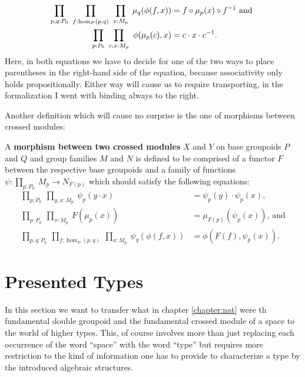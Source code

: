 \begin{defn}
\begin{itemize}
\begin{align*}
\prod_{p,q:P_0} ~ \prod_{f:\hom_P(p,q)} ~ \prod_{x:M_p} ~
	\mu_q(\phi(f,x)) &= f \circ \mu_p(x) \circ f^{-1} \text{ and } \\
\prod_{p:P_0} ~ \prod_{c,x:M_p} ~ \phi(\mu_p(c),x) &= c \cdot x \cdot c^{-1} \text{.}
\end{align*}
Here, in both equations we have to decide for one of the two ways to place parentheses
in the right-hand side of the equation, because associativity only holds propositionally.
Either way will cause us to require transporting, in the formalization I went with
binding always to the right.
\end{itemize}
\end{defn}

Another definition which will cause no surprise is the one of morphisms between
crossed modules:

\begin{defn}
A \textbf{morphism between two crossed modules} $X$ and $Y$ on base groupoids
$P$ and $Q$ and group families $M$ and $N$ is defined to be comprised
of a functor $F$ between the respective base groupoids and a family of functions
$\psi : \prod_{p:P_0} ~ M_p \to N_{F(p)}$ which should satisfy the following equations:
\begin{align*}
\prod_{p:P_0} ~ \prod_{y,x:M_p} ~ \psi_p(y \cdot x) &= \psi_p(y) \cdot \psi_p(x) \text{,} \\
\prod_{p:P_0} ~ \prod_{x:M_p} ~ F(\mu_p(x)) &= \mu_{F(p)}(\psi_p(x)) \text{, and} \\
\prod_{p,q:P_0} ~ \prod_{f:\hom_P(p,q)} ~ \prod_{x:M_p} ~
	\psi_q(\phi(f,x)) &= \phi(F(f),\psi_p(x)) \text{.}
\end{align*}
\end{defn}


\section{Presented Types}

In this section we want to transfer what in chapter \ref{chapter:nat} were th
fundamental double groupoid and the fundamental crossed module of a space to the
world of higher types.
This, of course involves more than just replacing each occurrence of the word
``space'' with the word ``type'' but requires more restriction to the kind of
information one has to provide to characterize a type by the introduced algebraic
structures.

